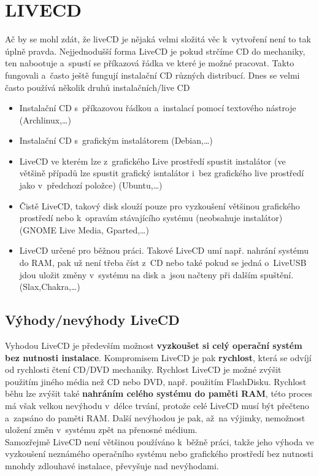 \documentclass[a4paper,12pt]{article}
\newcommand{\upc}[1]{\uppercase{#1}} %
\begin{document}
\section{\upc{LiveCD}}
Ač by se mohl zdát, že liveCD je nějaká velmi složitá věc k~vytvoření není to tak úplně pravda. Nejjednodušší forma LiveCD je pokud strčíme CD do mechaniky, ten nabootuje a~spustí se příkazová řádka ve které je možné pracovat. Takto fungovali a~často ještě fungují instalační CD různých distribucí. Dnes se velmi často používá několik druhů instalačních/live CD
\begin{itemize}
 \item Instalační CD s~příkazovou řádkou a~instalací pomocí textového nástroje (Archlinux,…)
 \item Instalační CD s~grafickým instalátorem (Debian,…)
 \item LiveCD ve kterém lze z~grafického Live prostředí spustit instalátor (ve většině případů lze spustit grafický isntalátor i~bez grafického live prostředí jako v~předchozí položce) (Ubuntu,…)
 \item Čistě LiveCD, takový disk slouží pouze pro vyzkoušení většinou grafického prostředí nebo k~opravám stávajícího systému (neobsahuje instalátor) (GNOME Live Media, Gparted,…)
 \item LiveCD určené pro běžnou práci. Takové LiveCD umí např. nahrání systému do RAM, pak už není třeba číst z~CD nebo také pokud se jedná o~LiveUSB jdou uložit změny v~systému na disk a~jsou načteny při dalším spuštění. (Slax,Chakra,…)
\end{itemize}

\subsection{Výhody/nevýhody LiveCD}
Vyhodou LiveCD je především možnost \textbf{vyzkoušet si celý operační systém bez nutnosti instalace}. Kompromisem LiveCD je pak \textbf{rychlost}, která se odvíjí od rychlosti čtení CD/DVD mechaniky. Rychlost LiveCD je možné zvýšit použitím jiného média než CD nebo DVD, např. použitím FlashDisku. Rychlost běhu lze zvýšit také \textbf{nahráním celého systému do paměti RAM}, této proces má však velkou nevýhodu v~délce trvání, protože celé LiveCD musí být přečteno a~zapsáno do paměti RAM. Další nevýhodou je pak, až~na výjimky, nemožnost uložení změn v~systému zpět na přenosné médium.\\

Samozřejmě LiveCD není většinou používáno k~běžně práci, takže jeho výhoda ve vyzkoušení neznámého operačního systému nebo grafického prostředí bez nutnosti mnohdy zdlouhavé instalace, převyšuje nad nevýhodami.
\end{document}
